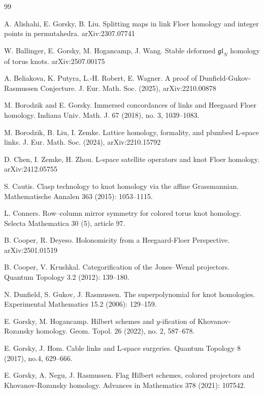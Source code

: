 \documentclass{amsart}
\begin{document}
\begin{thebibliography}{99}

 A. Alishahi, E. Gorsky, B. Liu. Splitting maps in link Floer homology and integer points in permutahedra. arXiv:2307.07741

 W. Ballinger, E. Gorsky, M. Hogancamp, J. Wang. Stable deformed $\mathfrak{gl}_N$ homology of torus knots. arXiv:2507.00175


  A. Beliakova, K. Putyra, L.-H. Robert, E. Wagner. A proof of Dunfield-Gukov-Rasmussen Conjecture. J. Eur. Math. Soc. (2025), arXiv:2210.00878

 M. Borodzik and E. Gorsky. Immersed concordances of links and Heegaard Floer homology. Indiana Univ. Math. J. 67 (2018), no. 3, 1039--1083. 



 M. Borodzik, B. Liu, I. Zemke. Lattice homology, formality,  and plumbed L-space links.  J. Eur. Math. Soc. (2024), arXiv:2210.15792

 D. Chen, I. Zemke, H. Zhou. L-space satellite operators and knot Floer homology. arXiv:2412.05755

 S. Cautis. Clasp technology to knot homology via the affine Grassmannian. Mathematische Annalen 363 (2015): 1053--1115.

 L. Conners. Row--column mirror symmetry for colored torus knot homology.
Selecta Mathematica 30 (5), article 97.

 B. Cooper, R. Deyeso.  Holonomicity from a Heegaard-Floer Perspective. arXiv:2501.01519

 B. Cooper, V. Krushkal. Categorification of the Jones--Wenzl projectors. Quantum Topology 3.2 (2012): 139--180.

 N. Dunfield, S. Gukov, J. Rasmussen. The superpolynomial for knot homologies. Experimental Mathematics 15.2 (2006): 129--159.

 E. Gorsky, M. Hogancamp. Hilbert schemes and  $y$-ification of Khovanov-Rozansky homology.
Geom. Topol. 26 (2022), no. 2, 587--678.

 E. Gorsky, J. Hom. Cable links and L-space surgeries.  
Quantum Topology 8 (2017), no.4, 629--666.

 E. Gorsky, A. Negu, J. Rasmussen. Flag Hilbert schemes, colored projectors and Khovanov-Rozansky homology. Advances in Mathematics 378 (2021): 107542.


\end{thebibliography}
\end{document}
